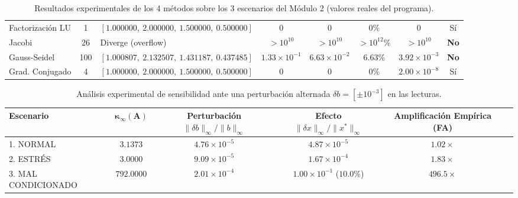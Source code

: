 \documentclass[a4paper,12pt]{article}
\begin{document}
\begin{table}[H]
\begin{adjustbox}{max width=\textwidth}
\begin{tabular}{@{}p{2.3cm} c p{3.3cm} c c c c c@{}}
Factorización LU & 1 & $[1.000000,\ 2.000000,\ 1.500000,\ 0.500000]$ & $0$ & $0$ & $0\%$ & $0$ & Sí \\
Jacobi & 26 & Diverge (overflow) & $>10^{10}$ & $>10^{10}$ & $>10^{12}\%$ & $>10^{10}$ & \textbf{No} \\
Gauss-Seidel & 100 & $[1.000807,\ 2.132507,\ 1.431187,\ 0.437485]$ & $1.33\times10^{-1}$ & $6.63\times10^{-2}$ & $6.63\%$ & $3.92\times10^{-3}$ & \textbf{No} \\
Grad. Conjugado & 4 & $[1.000000,\ 2.000000,\ 1.500000,\ 0.500000]$ & $0$ & $0$ & $0\%$ & $2.00\times10^{-8}$ & Sí \\
\bottomrule
\end{tabular}
\end{adjustbox}
\caption{Resultados experimentales de los 4 métodos sobre los 3 escenarios del Módulo 2 (valores reales del programa).}
\end{table}

\begin{table}[H]
\centering
\footnotesize
\setlength{\tabcolsep}{4pt}
\begin{adjustbox}{max width=\textwidth}
\begin{tabular}{lccccc}
\toprule
\textbf{Escenario} & $\mathbf{\kappa_\infty(A)}$ & \textbf{Perturbación $\|\delta b\|_\infty / \|b\|_\infty$} & \textbf{Efecto $\|\delta x\|_\infty / \|x^*\|_\infty$} & \textbf{Amplificación Empírica (FA)} \\
\midrule
1. NORMAL & $3.1373$ & $4.76 \times 10^{-5}$ & $4.87 \times 10^{-5}$ & $1.02\times$ \\
2. ESTRÉS & $3.0000$ & $9.09 \times 10^{-5}$ & $1.67 \times 10^{-4}$ & $1.83\times$ \\
3. MAL CONDICIONADO & $792.0000$ & $2.01 \times 10^{-4}$ & $1.00 \times 10^{-1}$ ($10.0\%$) & $\mathbf{496.5\times}$ \\
\bottomrule
\end{tabular}
\end{adjustbox}
\caption{Análisis experimental de sensibilidad ante una perturbación alternada $\delta b = [\pm 10^{-3}]$ en las lecturas.}
\end{table}
\end{document}
